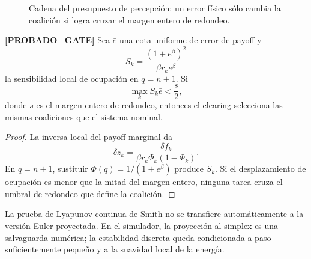 \begin{figure}[H]
\centering
{}
\caption{Cadena del presupuesto de percepción: un error físico sólo cambia la coalición
si logra cruzar el margen entero de redondeo.}
\label{fig:marco_percepcion}
\end{figure}

\begin{teorema} \textbf{[PROBADO+GATE]}
Sea $\bar e$ una cota uniforme de error de payoff y
\[
  S_k=\frac{(1+e^\beta)^2}{\beta r_ke^\beta}
\]
la sensibilidad local de ocupación en $q=n+1$. Si
\[
  \max_k S_k\bar e < \frac{s}{2},
\]
donde $s$ es el margen entero de redondeo, entonces el clearing selecciona las mismas
coaliciones que el sistema nominal.
\end{teorema}

\begin{proof}
La inversa local del payoff marginal da
\[
  \delta z_k=
  \frac{\delta f_k}{\beta r_k\Phi_k(1-\Phi_k)}.
\]
En $q=n+1$, sustituir $\Phi(q)=1/(1+e^\beta)$ produce $S_k$. Si el desplazamiento de
ocupación es menor que la mitad del margen entero, ninguna tarea cruza el umbral de
redondeo que define la coalición.
\end{proof}

La prueba de Lyapunov continua de Smith no se transfiere automáticamente a la versión
Euler-proyectada. En el simulador, la proyección al simplex es una salvaguarda numérica;
la estabilidad discreta queda condicionada a paso suficientemente pequeño y a la
suavidad local de la energía.

